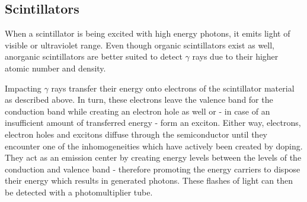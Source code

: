 \subsection{Scintillators}
When a scintillator is being excited with high energy photons, it emits light of visible or ultraviolet range.
Even though organic scintillators exist as well, anorganic scintillators are better suited to detect $\gamma$ rays due to their higher atomic number and density. \cite{Anleitung}
%
\par
%
Impacting $\gamma$ rays transfer their energy onto electrons of the scintillator material as described above.
In turn, these electrons leave the valence band for the conduction band while creating an electron hole as well or - in case of an insufficient amount of transferred energy - form an exciton.
Either way, electrons, electron holes and excitons diffuse through the semiconductor until they encounter one of the inhomogeneities which have actively been created by doping.
They act as an emission center by creating energy levels between the levels of the conduction and valence band - therefore promoting the energy carriers to dispose their energy which results in generated photons.
These flashes of light can then be detected with a photomultiplier tube.
